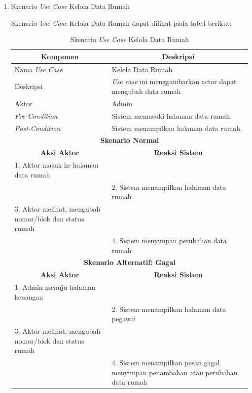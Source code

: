 \begin{enumerate}[label=\alph*.]
    
    \item Skenario \textit{Use Case} Kelola Data Rumah
	\par Skenario \textit{Use Case} Kelola Data Rumah dapat dilihat pada tabel berikut:

       \begin{longtable}{|p{5cm}|p{9cm}|}
	    \caption{Skenario \textit{Use Case} Kelola Data Rumah}
	    \label{tab:my-table} \\ \hline
	    \multicolumn{1}{|c|}{\textbf{Komponen}} & \multicolumn{1}{c|}{\textbf{Deskripsi}} \\ \hline
	    \endfirsthead
	    \endhead
	    Nama \textit{Use Case} & Kelola Data Rumah \\ \hline
	    Deskripsi & \textit{Use case} ini menggambarkan actor dapat mengubah data rumah \\ \hline
	    Aktor & Admin \\ \hline
	    \textit{Pre-Condition} & Sistem memasuki halaman data rumah. \\ \hline
	    \textit{Post-Condition} & Sistem menampilkan halaman data rumah. \\ \hline
	    \multicolumn{2}{|c|}{\textbf{Skenario Normal}} \\ \hline
	    \multicolumn{1}{|c|}{\textbf{Aksi Aktor}} & \multicolumn{1}{c|}{\textbf{Reaksi Sistem}} \\ \hline
	    1. Aktor masuk ke halaman data rumah & \\ \hline
	    & 2. Sistem menampilkan halaman data rumah \\ \hline
	    3. Aktor melihat, mengubah nomor/blok dan status rumah & \\ \hline
	    & 4. Sistem menyimpan perubahan data rumah \\ \hline
	    \multicolumn{2}{|c|}{\textbf{Skenario Alternatif: Gagal}} \\ \hline
	    \multicolumn{1}{|c|}{\textbf{Aksi Aktor}} & \multicolumn{1}{c|}{\textbf{Reaksi Sistem}} \\ \hline
	    1. Admin menuju halaman keuangan & \\ \hline
	    & 2. Sistem menampilkan halaman data pegawai \\ \hline
	    3. Aktor melihat, mengubah nomor/blok dan status rumah & \\ \hline
	    & 4. Sistem menampilkan pesan gagal menyimpan penambahan atau perubahan data rumah \\ \hline
	\end{longtable}


\end{enumerate}
